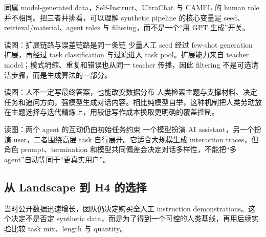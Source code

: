 同属 model-generated data，Self-Instruct、UltraChat 与 CAMEL 的 human role 并不相同。把三者并排看，可以理解 synthetic pipeline 的核心变量是 seed、retrieval/material、agent roles 与 filtering，而不是一个“用 GPT 生成”开关。


\begin{knowledgebox}{读图：扩展链路与误差链路是同一条链}
少量人工 seed 经过 few-shot generation 扩展，再经过 task classification 与过滤进入 task pool。扩展能力来自 teacher model；模式坍缩、重复和错误也从同一 teacher 传播，因此 filtering 不是可选清洁步骤，而是生成算法的一部分。
\end{knowledgebox}


\begin{knowledgebox}{读图：人不一定写最终答案，也能改变数据分布}
人类检索主题与支撑材料、决定任务和追问方向，强模型生成对话内容。相比纯模型自举，这种机制把人类劳动放在主题选择与迭代精炼上，用较低写作成本换取更明确的覆盖控制。
\end{knowledgebox}


\begin{knowledgebox}{读图：两个 agent 的互动仍由初始任务约束}
一个模型扮演 AI assistant，另一个扮演 user，二者围绕高层 task 自行展开。它适合大规模生成 interaction traces，但角色 prompt、termination 和模型共同偏差会决定对话多样性，不能把“多 agent”自动等同于“更真实用户”。
\end{knowledgebox}


\subsection{从 Landscape 到 H4 的选择}

当时公开数据迅速增长，团队仍决定购买全人工 instruction demonstrations。这个决定不是否定 synthetic data，而是为了得到一个可控的人类基线，再用后续实验比较 task mix、length 与 quantity。


